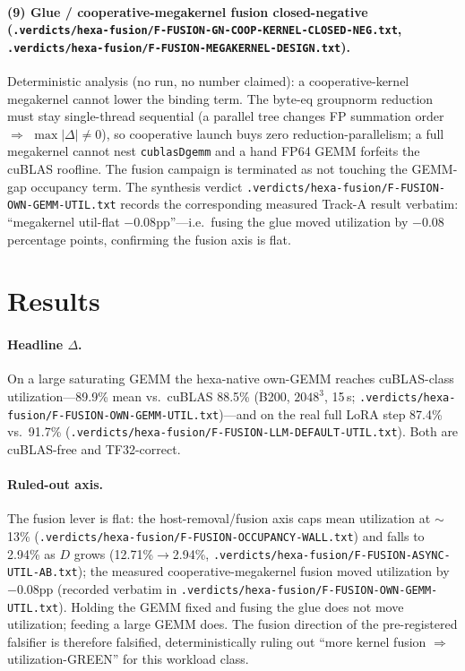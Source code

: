 \documentclass[11pt,a4paper]{article}
\newcommand{\vd}[1]{\texttt{.verdicts/hexa-fusion/#1.txt}}
\begin{document}
\paragraph{(9) Glue / cooperative-megakernel fusion closed-negative
(\vd{F-FUSION-GN-COOP-KERNEL-CLOSED-NEG}, \vd{F-FUSION-MEGAKERNEL-DESIGN}).}
Deterministic analysis (no run, no number claimed): a cooperative-kernel
megakernel cannot lower the binding term. The byte-eq groupnorm reduction must
stay single-thread sequential (a parallel tree changes FP summation order
$\Rightarrow$ $\max|\Delta|\neq0$), so cooperative launch buys zero
reduction-parallelism; a full megakernel cannot nest \texttt{cublasDgemm} and a
hand FP64 GEMM forfeits the cuBLAS roofline. The fusion campaign is terminated as
not touching the GEMM-gap occupancy term. The synthesis verdict
\vd{F-FUSION-OWN-GEMM-UTIL} records the corresponding measured Track-A result
verbatim: ``megakernel util-flat $-0.08$pp''---i.e.\ fusing the glue moved
utilization by $-0.08$ percentage points, confirming the fusion axis is flat.

\section{Results}
\label{sec:results}

\paragraph{Headline $\Delta$.} On a large saturating GEMM the hexa-native
own-GEMM reaches cuBLAS-class utilization---89.9\% mean vs.\ cuBLAS 88.5\%
(B200, $2048^3$, 15\,s; \vd{F-FUSION-OWN-GEMM-UTIL})---and on the real full LoRA
step 87.4\% vs.\ 91.7\% (\vd{F-FUSION-LLM-DEFAULT-UTIL}). Both are cuBLAS-free and
TF32-correct.

\paragraph{Ruled-out axis.} The fusion lever is flat: the host-removal/fusion
axis caps mean utilization at $\sim$13\% (\vd{F-FUSION-OCCUPANCY-WALL}) and falls
to 2.94\% as $D$ grows (12.71\%$\to$2.94\%, \vd{F-FUSION-ASYNC-UTIL-AB}); the
measured cooperative-megakernel fusion moved utilization by $-0.08$pp (recorded
verbatim in \vd{F-FUSION-OWN-GEMM-UTIL}).
Holding the GEMM fixed and fusing the glue does not move utilization; feeding a
large GEMM does. The fusion direction of the pre-registered falsifier is
therefore falsified, deterministically ruling out ``more kernel fusion
$\Rightarrow$ utilization-GREEN'' for this workload class.
\end{document}
